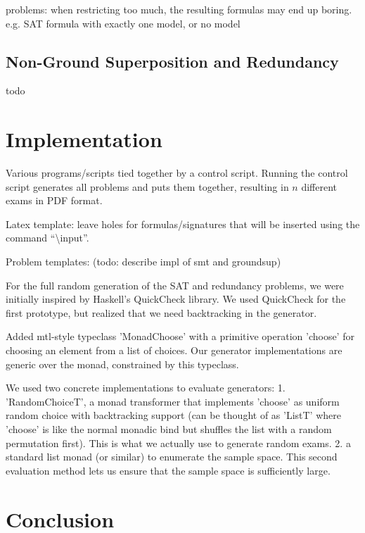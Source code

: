 \documentclass[12pt]{llncs}
\begin{document}
problems:
when restricting too much, the resulting formulas may end up boring.
e.g. SAT formula with exactly one model, or no model


\subsection{Non-Ground Superposition and Redundancy}

todo


\section{Implementation}



Various programs/scripts tied together by a control script.
Running the control script generates all problems and puts them together, resulting in $n$ different exams in PDF format.


Latex template:
leave holes for formulas/signatures that will be inserted using the command ``\textbackslash{}input''.


Problem templates: (todo: describe impl of smt and groundsup)


For the full random generation of the SAT and redundancy problems,
we were initially inspired by Haskell's QuickCheck library.
We used QuickCheck for the first prototype, but realized that we need backtracking in the generator.

Added mtl-style typeclass 'MonadChoose' with a primitive operation 'choose' for choosing an element from a list of choices.
Our generator implementations are generic over the monad, constrained by this typeclass.

We used two concrete implementations to evaluate generators:
1. 'RandomChoiceT', a monad transformer that implements 'choose' as uniform random choice with backtracking support
    (can be thought of as 'ListT' where 'choose' is like the normal monadic bind but shuffles the list with a random permutation first).
    This is what we actually use to generate random exams.
2. a standard list monad (or similar) to enumerate the sample space.
    This second evaluation method lets us ensure that the sample space is sufficiently large.



\section{Conclusion}





% 
% 
\end{document}
